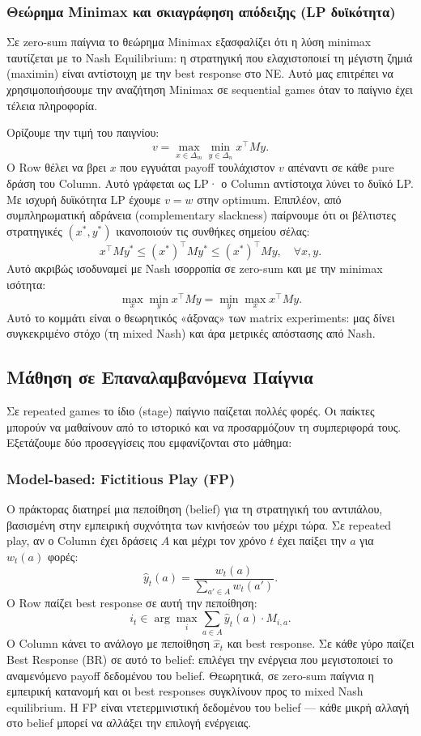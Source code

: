 \documentclass[11pt,a4paper]{article}
\begin{document}
\subsubsection{Θεώρημα Minimax και σκιαγράφηση απόδειξης (LP δυϊκότητα)}

Σε zero-sum παίγνια το θεώρημα Minimax εξασφαλίζει ότι η λύση minimax ταυτίζεται με το Nash Equilibrium: η στρατηγική που ελαχιστοποιεί τη μέγιστη ζημιά (maximin) είναι αντίστοιχη με την best response στο NE. Αυτό μας επιτρέπει να χρησιμοποιήσουμε την αναζήτηση Minimax σε sequential games όταν το παίγνιο έχει τέλεια πληροφορία.

Ορίζουμε την τιμή του παιγνίου:
\[
v = \max_{x \in \Delta_m} \min_{y \in \Delta_n} x^\top M y.
\]
Ο Row θέλει να βρει \(x\) που εγγυάται payoff τουλάχιστον \(v\) απέναντι σε κάθε pure δράση του Column. Αυτό γράφεται ως LP· ο Column αντίστοιχα λύνει το δυϊκό LP. Με ισχυρή δυϊκότητα LP έχουμε \(v=w\) στην optimum. Επιπλέον, από συμπληρωματική αδράνεια (complementary slackness) παίρνουμε ότι οι βέλτιστες στρατηγικές \((x^*, y^*)\) ικανοποιούν τις συνθήκες σημείου σέλας:
\[
x^\top M y^* \le (x^*)^\top M y^* \le (x^*)^\top M y, \quad \forall x,y.
\]
Αυτό ακριβώς ισοδυναμεί με Nash ισορροπία σε zero-sum και με την minimax ισότητα:
\[
\max_x \min_y x^\top M y = \min_y \max_x x^\top M y.
\]
Αυτό το κομμάτι είναι ο θεωρητικός «άξονας» των matrix experiments: μας δίνει συγκεκριμένο στόχο (τη mixed Nash) και άρα μετρικές απόστασης από Nash.

\subsection{Μάθηση σε Επαναλαμβανόμενα Παίγνια}

Σε repeated games το ίδιο (stage) παίγνιο παίζεται πολλές φορές. Οι παίκτες μπορούν να μαθαίνουν από το ιστορικό και να προσαρμόζουν τη συμπεριφορά τους. Εξετάζουμε δύο προσεγγίσεις που εμφανίζονται στο μάθημα:

\subsubsection{Model-based: Fictitious Play (FP)}

Ο πράκτορας διατηρεί μια πεποίθηση (belief) για τη στρατηγική του αντιπάλου, βασισμένη στην εμπειρική συχνότητα των κινήσεών του μέχρι τώρα. Σε repeated play, αν ο Column έχει δράσεις \(A\) και μέχρι τον χρόνο \(t\) έχει παίξει την \(a\) για \(w_t(a)\) φορές:
\[
\hat{y}_t(a) = \frac{w_t(a)}{\sum_{a' \in A} w_t(a')}.
\]
Ο Row παίζει best response σε αυτή την πεποίθηση:
\[
i_t \in \arg\max_i \sum_{a \in A} \hat{y}_t(a) \cdot M_{i,a}.
\]
Ο Column κάνει το ανάλογο με πεποίθηση \(\hat{x}_t\) και best response. Σε κάθε γύρο παίζει Best Response (BR) σε αυτό το belief: επιλέγει την ενέργεια που μεγιστοποιεί το αναμενόμενο payoff δεδομένου του belief. Θεωρητικά, σε zero-sum παίγνια η εμπειρική κατανομή και οι best responses συγκλίνουν προς το mixed Nash equilibrium. Η FP είναι ντετερμινιστική δεδομένου του belief — κάθε μικρή αλλαγή στο belief μπορεί να αλλάξει την επιλογή ενέργειας.
\end{document}
